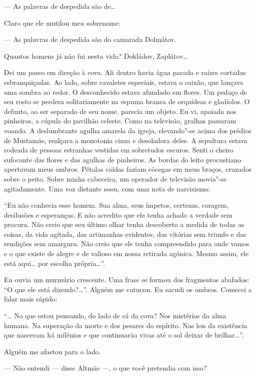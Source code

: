 --- As palavras de despedida são de\ldots{} \label{ref9}

Claro que ele mutilou meu sobrenome:

--- As palavras de despedida são do camarada Dolmátov.

Quantos homens já não fui nesta vida? Dokládov, Zaplátov\ldots{}

Dei um passo em direção à cova. Ali dentro havia água parada e raízes
cortadas esbranquiçadas. Ao lado, sobre cavaletes especiais, estava o
caixão, que lançava uma sombra ao redor. O desconhecido estava afundado
em flores. Um pedaço de seu rosto se perdera solitariamente na espuma
branca de orquídeas e gladíolos. O defunto, ao ser separado de seu nome,
parecia um objeto. Eu vi, apoiada nos pinheiros, a cúpula do pavilhão celeste.
Como na televisão, gralhas passaram voando. A deslumbrante agulha
amarela da igreja, elevando"-se acima dos prédios de Mustamäe, realçava a
monotonia cinza e desoladora deles. A sepultura estava rodeada de
pessoas estranhas vestidas em sobretudos escuros. Senti o cheiro
sufocante das flores e das agulhas de pinheiros. As bordas do leito
procustiano apertavam meus ombros. Pétalas caídas faziam cócegas em meus
braços, cruzados sobre o peito. Sobre minha cabeceira, um operador de
televisão movia"-se agitadamente. Uma voz distante soou, com uma nota de
narcisismo:

``Eu não conhecia esse homem. Sua alma, seus ímpetos, certezas, coragem,
desilusões e esperanças. E não acredito que ele tenha achado a verdade
sem procura. Não creio que seu último olhar tenha descoberto a medida de
todas as coisas, da vida agitada, das artimanhas evidentes, das vitórias
sem triunfo e das rendições sem amargura. Não creio que ele tenha
compreendido para onde vamos e o que existe de alegre e de valioso em
nossa retirada agônica. Mesmo assim, ele está aqui\ldots{} por escolha
própria\ldots{}''.

Eu ouvia um murmúrio crescente. Uma frase se formou dos fragmentos
abafados: ``O que ele está dizendo?\ldots{}''. Alguém me cutucou. Eu sacudi
os ombros. Comecei a falar mais rápido:

``\ldots{} No que estou pensando, do lado de cá da cova? Nos mistérios da \label{ref6}
alma humana. Na superação da morte e dos pesares do espírito. Nas leis
da existência que nasceram há milênios e que continuarão vivas até o sol
deixar de brilhar\ldots{}''.

Alguém me afastou para o lado.

--- Não entendi --- disse Altmäe ---, o que você pretendia com isso?

